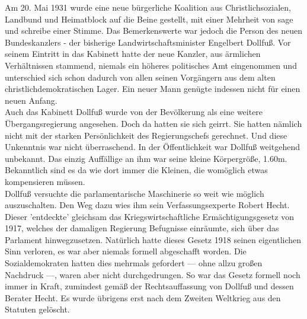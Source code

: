 \documentclass[letterpaper, 12pt]{article}
\begin{document}
Am 20. Mai 1931 wurde eine neue bürgerliche Koalition aus Christlichsozialen, Landbund und Heimatblock auf die Beine gestellt, mit einer Mehrheit von sage und schreibe einer Stimme. Das Bemerkenswerte war jedoch die Person des neuen Bundeskanzlers - der bisherige Landwirtschaftsminister Engelbert Dollfuß. Vor seinem Eintritt in das Kabinett hatte der neue Kanzler, aus ärmlichen Verhältnissen stammend, niemals ein höheres politisches Amt eingenommen und unterschied sich schon dadurch von allen seinen Vorgängern aus dem alten christlichdemokratischen Lager. Ein neuer Mann genügte indessen nicht für einen neuen Anfang. \\ Auch das Kabinett Dollfuß wurde von der Bevölkerung als eine weitere Übergangsregierung angesehen. Doch da hatten sie sich geirrt. Sie hatten nämlich nicht mit der starken Persönlichkeit des Regierungschefs gerechnet. Und diese Unkenntnis war nicht überraschend. In der Öffentlichkeit war Dollfuß weitgehend unbekannt. Das einzig Auffällige an ihm war seine kleine Körpergröße, 1.60m. Bekanntlich sind es da wie dort immer die Kleinen, die womöglich etwas kompensieren müssen. \\
Dollfuß versuchte die parlamentarische Maschinerie so weit wie möglich auszuschalten. Den Weg dazu wies ihm sein Verfassungsexperte Robert Hecht. Dieser 'entdeckte' gleichsam das Kriegswirtschaftliche Ermächtigungsgesetz von 1917, welches der damaligen Regierung Befugnisse einräumte, sich über das Parlament hinwegzusetzen. Natürlich hatte dieses Gesetz 1918 seinen eigentlichen Sinn verloren, es war aber niemals formell abgeschafft worden. Die Sozialdemokraten hatten dies mehrmals gefordert — ohne allzu großen Nachdruck —, waren aber nicht durchgedrungen. So war das Gesetz formell noch immer in Kraft, zumindest gemäß der Rechtsauffassung von Dollfuß und dessen Berater Hecht. Es wurde übrigens erst nach dem Zweiten Weltkrieg aus den Statuten gelöscht. \\
\end{document}
